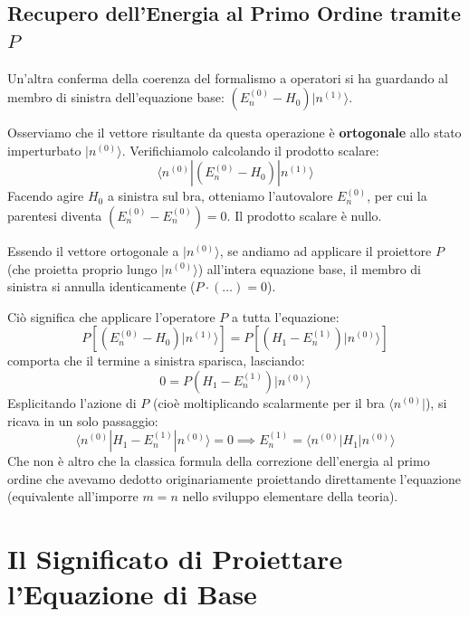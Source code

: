 \subsection{Recupero dell'Energia al Primo Ordine tramite $P$}
Un'altra conferma della coerenza del formalismo a operatori si ha guardando al membro di sinistra dell'equazione base: $\left( E_n^{(0)} - H_0 \right) \vert{}n^{(1)}\rangle$.

Osserviamo che il vettore risultante da questa operazione è \textbf{ortogonale} allo stato imperturbato $\vert{}n^{(0)}\rangle$. Verifichiamolo calcolando il prodotto scalare:
\begin{equation}
\langle n^{(0)} | \left( E_n^{(0)} - H_0 \right) | n^{(1)} \rangle
\end{equation}
Facendo agire $H_0$ a sinistra sul bra, otteniamo l'autovalore $E_n^{(0)}$, per cui la parentesi diventa $(E_n^{(0)} - E_n^{(0)}) = 0$. Il prodotto scalare è nullo.

Essendo il vettore ortogonale a $\vert{}n^{(0)}\rangle$, se andiamo ad applicare il proiettore $P$ (che proietta proprio lungo $\vert{}n^{(0)}\rangle$) all'intera equazione base, il membro di sinistra si annulla identicamente ($P \cdot (\dots) = 0$).

Ciò significa che applicare l'operatore $P$ a tutta l'equazione:
\begin{equation}
P \left[ \left( E_n^{(0)} - H_0 \right) |n^{(1)}\rangle \right] = P \left[ \left( H_1 - E_n^{(1)} \right) |n^{(0)}\rangle \right]
\end{equation}
comporta che il termine a sinistra sparisca, lasciando:
\begin{equation}
0 = P \left( H_1 - E_n^{(1)} \right) |n^{(0)}\rangle
\end{equation}
Esplicitando l'azione di $P$ (cioè moltiplicando scalarmente per il bra $\langle n^{(0)}\vert{}$), si ricava in un solo passaggio:
\begin{equation}
\langle n^{(0)} | H_1 - E_n^{(1)} |n^{(0)}\rangle = 0 \implies E_n^{(1)} = \langle n^{(0)} | H_1 |n^{(0)}\rangle
\end{equation}
Che non è altro che la classica formula della correzione dell'energia al primo ordine che avevamo dedotto originariamente proiettando direttamente l'equazione (equivalente all'imporre $m=n$ nello sviluppo elementare della teoria).

\section{Il Significato di Proiettare l'Equazione di Base}

